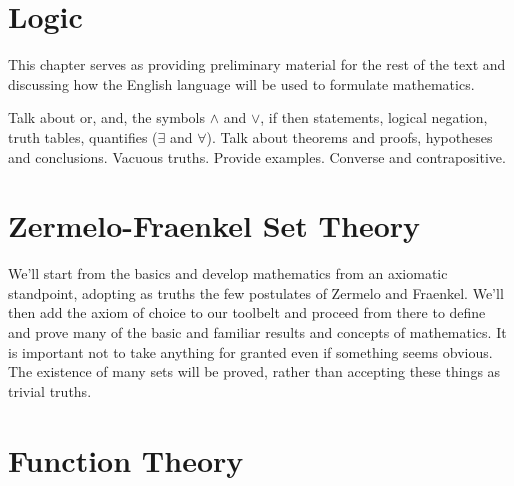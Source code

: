 \chapter{Logic}
    This chapter serves as providing preliminary material for the rest of
    the text and discussing how the English language will be used to formulate
    mathematics.
    \par\hfill\par
    Talk about or, and, the symbols $\land$ and $\lor$, if then statements,
    logical negation, truth tables, quantifies ($\exists$ and $\forall$).
    Talk about theorems and proofs, hypotheses and conclusions.
    Vacuous truths. Provide examples. Converse and contrapositive.
\chapter{Zermelo-Fraenkel Set Theory}
    We'll start from the basics and develop mathematics from an axiomatic
    standpoint, adopting as truths the few postulates of Zermelo and
    Fraenkel. We'll then add the axiom of choice to our toolbelt and
    proceed from there to define and prove many of the basic and familiar
    results and concepts of mathematics. It is important not to take anything
    for granted even if something seems obvious. The existence of many sets
    will be proved, rather than accepting these things as trivial truths.
    \ifcsname\PATH\endcsname
        \newcommand{\PATH}{books/Foundations/Zermelo_Fraenkel_Set_Theory}
    \else
        \renewcommand{\PATH}{books/Foundations/Zermelo_Fraenkel_Set_Theory}
    \fi




    
\chapter{Function Theory}
    